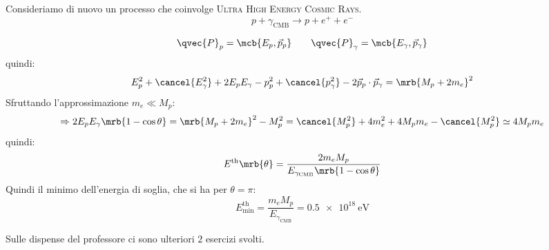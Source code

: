 \begin{example}[UHECR]
  Consideriamo di nuovo un processo che coinvolge \textsc{Ultra High Energy
  Cosmic Rays}.
  \begin{equation}
    p + \gamma _\text{CMB} \rightarrow p + e^+ + e^-
  \end{equation}

  \begin{equation}
    \qvec{P}_{p} = \mcb{E _{p}, \vec{p}_{p}}
    \qquad
    \qvec{P}_{\gamma} = \mcb{E _{\gamma}, \vec{p}_{\gamma}}
  \end{equation}
  quindi:
  \begin{equation}
    E^2 _{p} + \cancel{E _{\gamma}^{2}} + 2 E _{p} E _{\gamma} - p^2 _{p} +
    \cancel{p ^{2} _{\gamma}} - 2 \vec{p}_{p} \cdot \vec{p}_{\gamma} = \mrb{M
    _{p} + 2 m_e}^{2}
  \end{equation}
  Sfruttando l'approssimazione $m _{e} \ll M _{p}$:
  \begin{equation}
    \Rightarrow 2 E_p E _{\gamma} \mrb{1 - \cos \theta} = \mrb{M _{p} + 2
    m_e}^{2} - M _{p}^{2} = \cancel{M _{p}^{2}} + 4 m _{e}^{2} + 4 M _{p} m_e -
    \cancel{M _{p}^{2}} \simeq 4 M_p m_e
  \end{equation}
  quindi:
  \begin{equation}
    E ^\text{th} \mrb{\theta} = \frac{2 m_e M_p}{E _{\gamma_\text{CMB}} \mrb{1
    - \cos \theta}}
  \end{equation}
  Quindi il minimo dell'energia di soglia, che si ha per $\theta = \pi$:
  \begin{equation}
    E ^\text{th}_\text{min} = \frac{m_e M _{p}}{E _{\gamma _\text{CMB}}} =
    \qty{0.5e18}{\eV}
  \end{equation}
\end{example}

\begin{note}[]
  Sulle dispense del professore ci sono ulteriori $2$ esercizi svolti.
\end{note}
